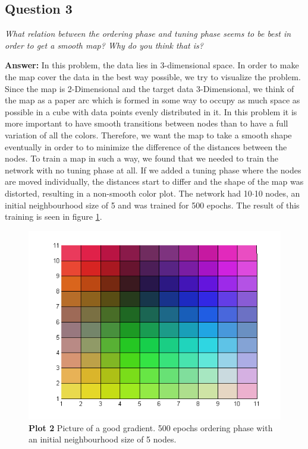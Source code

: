\documentclass[a4paper]{article}
\begin{document}
\subsection*{Question 3}
\emph{What relation between the ordering phase and tuning phase seems to be best in order to get a smooth map? Why do you think that is?}

\textbf{Answer:} 
In this problem, the data lies in 3-dimensional space. In order to make the map cover the data in the best way possible, we try to visualize the problem. Since the map is 2-Dimensional and the target data 3-Dimensional, we think of the map as a paper arc which is formed in some way to occupy as much space as possible in a cube with data points evenly distributed in it. In this problem it is more important to have smooth transitions between nodes than to have a full variation of all the colors. Therefore, we want the map to take a smooth shape eventually in order to to minimize the difference of the distances between the nodes. To train a map in such a way, we found that we needed to train the network with no tuning phase at all. If we added a tuning phase where the nodes are moved individually, the distances start to differ and the shape of the map was distorted, resulting in a non-smooth color plot. The network had 10$\cdot$10 nodes, an initial neighbourhood size of 5 and was trained for 500 epochs. The result of this training is seen in figure \ref{fig:plot1P10onP30}.

\begin{figure}[H] %
	\includegraphics[scale=0.7]{q2_Order500_15init_500epoch.png}
	\caption{\label{fig:plot1P10onP30}\textbf{Plot 2} Picture of a good gradient. 500 epochs ordering phase with an initial neighbourhood size of 5 nodes.}
\end{figure}
\pagebreak
\end{document}
